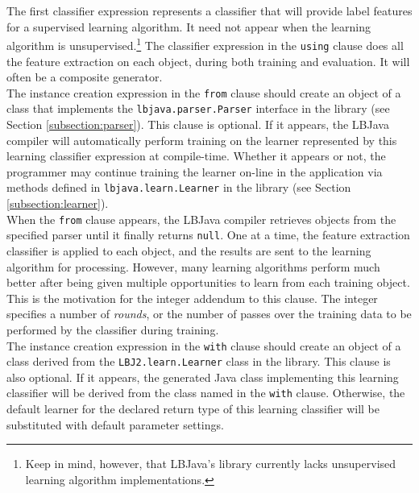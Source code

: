 \noindent
The first classifier expression represents a classifier that will provide
label features for a supervised learning algorithm.  It need not appear when
the learning algorithm is unsupervised.\footnote{Keep in mind, however, that
LBJava's library currently lacks unsupervised learning algorithm
implementations.}  The classifier expression in the {\tt using} clause does
all the feature extraction on each object, during both training and
evaluation.  It will often be a composite generator. \\

The instance creation expression in the {\tt from} clause should create an
object of a class that implements the {\tt lbjava.parser.Parser} interface in
the library (see Section \ref{subsection:parser}).  This clause is optional.
If it appears, the LBJava compiler will automatically perform training on the
learner represented by this learning classifier expression at compile-time.
Whether it appears or not, the programmer may continue training the learner
on-line in the application via methods defined in {\tt lbjava.learn.Learner} in
the library (see Section \ref{subsection:learner}). \\

When the {\tt from} clause appears, the LBJava compiler retrieves objects from
the specified parser until it finally returns {\tt null}.  One at a time, the
feature extraction classifier is applied to each object, and the results are
sent to the learning algorithm for processing.  However, many learning
algorithms perform much better after being given multiple opportunities to
learn from each training object.  This is the motivation for the integer
addendum to this clause.  The integer specifies a number of \emph{rounds}, or
the number of passes over the training data to be performed by the classifier
during training.  \\

The instance creation expression in the {\tt with} clause should create an
object of a class derived from the {\tt LBJ2.learn.Learner} class in the
library.  This clause is also optional.  If it appears, the generated Java
class implementing this learning classifier will be derived from the class
named in the {\tt with} clause.  Otherwise, the default learner for the
declared return type of this learning classifier will be substituted with
default parameter settings. \\

